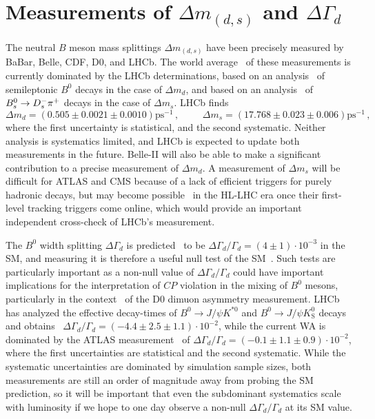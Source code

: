 \section{Measurements of $\Delta m_{(d,s)}$ and $\Delta\Gamma_d$}
\label{sec:dmdgd}

The neutral $B$ meson mass splittings $\Delta m_{(d,s)}$ have been precisely measured by BaBar, Belle, CDF, D0, and LHCb.
The world average~\cite{HFAG} of these measurements is currently dominated by the LHCb determinations,
based on an analysis~\cite{LHCb-PAPER-2015-031} of semileptonic $B^0$ decays in the case of $\Delta m_d$, and based on an analysis~\cite{LHCb-PAPER-2013-006} of $B^0_s \rightarrow {\ensuremath{D}}^-_s \pi^+$ decays
in the case of $\Delta m_s$. LHCb finds
\begin{equation}
\Delta m_d = (0.505 \pm 0.0021 \pm 0.0010) \textrm{ps}^{-1}\,,\phantom{space} 
\Delta m_s = (17.768 \pm 0.023 \pm 0.006) \textrm{ps}^{-1}\,,
\end{equation}
where the first uncertainty is statistical, and the second systematic. Neither analysis is systematics limited,
and LHCb is expected to update both measurements in the future. Belle-II will also be able to make a significant contribution
to a precise measurement of $\Delta m_d$. A measurement of $\Delta m_s$ will be difficult for ATLAS and CMS because of a lack of
efficient triggers for purely hadronic decays, but may become possible~\cite{PallaHLLHC} in the HL-LHC era once their first-level tracking triggers come online,
which would provide an important independent cross-check of LHCb's measurement.

The $B^0$ width splitting $\Delta\Gamma_d$ is predicted~\cite{Lenz:2011ti} to be $\Delta\Gamma_d/\Gamma_d = (4 \pm 1)\cdot 10^{-3}$ in the SM, and measuring it
is therefore a useful null test of the SM~\cite{Gershon:2010wx}. Such tests are particularly important as a non-null value of $\Delta\Gamma_d/\Gamma_d$ could have important
implications for the interpretation of $CP$ violation in the mixing of $B^0$ mesons, particularly in the context~\cite{Borissov:2013wwa} of the D0 dimuon asymmetry measurement.
LHCb has analyzed the effective decay-times of $B^0 \to J/\psi K^{*0}$
and $B^0 \to J/\psi K^0_\textrm{S}$ decays and obtains~\cite{LHCb-PAPER-2013-065} $\Delta\Gamma_d/\Gamma_d = (-4.4 \pm 2.5 \pm 1.1)\cdot 10^{-2}$,
while the current WA is dominated by the ATLAS measurement~\cite{Aaboud:2016bro}
of $\Delta\Gamma_d/\Gamma_d = (-0.1 \pm 1.1 \pm 0.9)\cdot 10^{-2}$, where the first uncertainties are statistical and the second systematic.
While the systematic uncertainties are dominated by simulation sample sizes, both measurements are still an order
of magnitude away from probing the SM prediction, so it will be important that even the subdominant
systematics scale with luminosity if we hope to one day observe a non-null $\Delta\Gamma_d/\Gamma_d$ at its SM value. 
 
